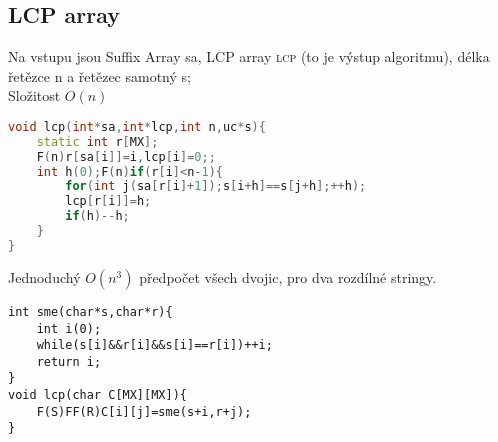 \documentclass[11pt]{article}
\begin{document}
\subsection{LCP array}
Na vstupu jsou Suffix Array \textsf{sa}, LCP array \textsc{lcp} (to je výstup algoritmu), délka řetězce \textsf{n} a řetězec samotný \textsf{s};
\\Složitost $O(n)$
\begin{lstlisting}[language=C++]
void lcp(int*sa,int*lcp,int n,uc*s){
    static int r[MX];
    F(n)r[sa[i]]=i,lcp[i]=0;;
    int h(0);F(n)if(r[i]<n-1){
        for(int j(sa[r[i]+1]);s[i+h]==s[j+h];++h);
        lcp[r[i]]=h;
        if(h)--h;
    }
}
\end{lstlisting}
Jednoduchý $O(n^3)$ předpočet všech dvojic, pro dva rozdílné stringy.
\begin{lstlisting}
int sme(char*s,char*r){
    int i(0);
    while(s[i]&&r[i]&&s[i]==r[i])++i;
    return i;
}
void lcp(char C[MX][MX]){
    F(S)FF(R)C[i][j]=sme(s+i,r+j);
}
\end{lstlisting}
\end{document}
